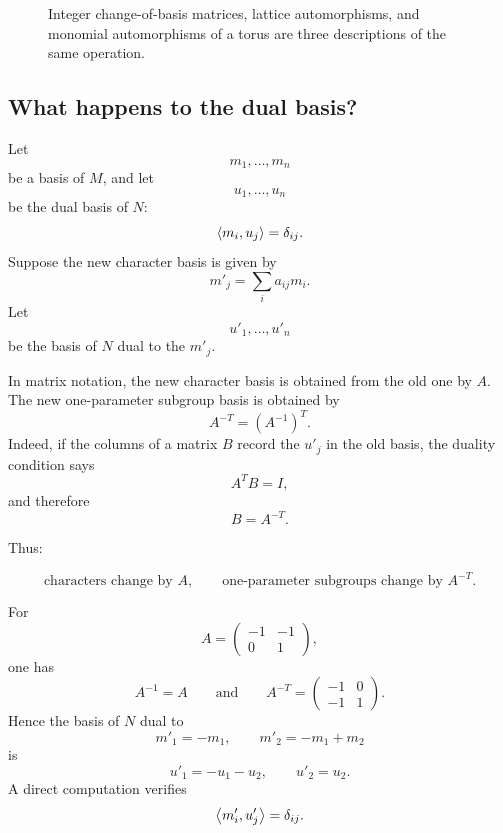 \begin{figure}[ht]
\centering
{}
\caption{Integer change-of-basis matrices, lattice automorphisms, and
monomial automorphisms of a torus are three descriptions of the same
operation.}
\label{fig:glz-basis-monomial-automorphism}
\end{figure}

\subsection{What happens to the dual basis?}

Let
\[
m_1,\ldots,m_n
\]
be a basis of \(M\), and let
\[
u_1,\ldots,u_n
\]
be the dual basis of \(N\):
\[
\left\langle m_i,u_j\right\rangle=\delta_{ij}.
\]
Suppose the new character basis is given by
\[
m'_j=\sum_i a_{ij}m_i.
\]
Let
\[
u'_1,\ldots,u'_n
\]
be the basis of \(N\) dual to the \(m'_j\).

In matrix notation, the new character basis is obtained from the old
one by \(A\). The new one-parameter subgroup basis is obtained by
\[
A^{-T}=(A^{-1})^T.
\]
Indeed, if the columns of a matrix \(B\) record the \(u'_j\) in the old
basis, the duality condition says
\[
A^TB=I,
\]
and therefore
\[
B=A^{-T}.
\]

Thus:

\[
\boxed{
\text{characters change by }A,
\qquad
\text{one-parameter subgroups change by }A^{-T}.
}
\]

\begin{example}
For
\[
A=
\begin{pmatrix}
-1&-1\\
0&1
\end{pmatrix},
\]
one has
\[
A^{-1}=A
\qquad\text{and}\qquad
A^{-T}=
\begin{pmatrix}
-1&0\\
-1&1
\end{pmatrix}.
\]
Hence the basis of \(N\) dual to
\[
m'_1=-m_1,
\qquad
m'_2=-m_1+m_2
\]
is
\[
u'_1=-u_1-u_2,
\qquad
u'_2=u_2.
\]
A direct computation verifies
\[
\left\langle m'_i,u'_j\right\rangle=\delta_{ij}.
\]
\end{example}

